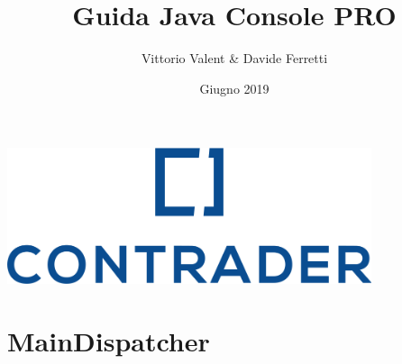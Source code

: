 \documentclass[a4paper,12 pt]{article}
\title{Guida Java Console PRO}
\author{Vittorio Valent \& Davide Ferretti}
\date{Giugno 2019}
\begin{document}
	\thispagestyle{empty}
	\begin{center}
		\includegraphics[height=4cm]{Logo.png}
	\end{center}
	
	\maketitle
	\newpage
	\tableofcontents
	\newpage

\section{MainDispatcher}
	
\end{document}
